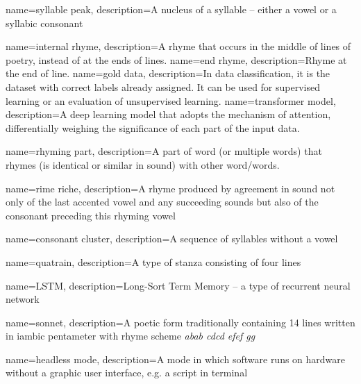 
{
	name=syllable peak,
	description={A nucleus of a syllable -- either a vowel or a syllabic consonant}
}

{
	name={internal rhyme},
	description={A rhyme that occurs in the middle of lines of poetry, instead of at the ends of lines.}
}
{
	name={end rhyme},
	description={Rhyme at the end of line.}
}
{
	name={gold data},
	description={In data classification, it is the dataset with correct labels already assigned. It can be used for supervised learning or an evaluation of unsupervised learning.}
}
{
	name=transformer model,
	description={A deep learning model that adopts the mechanism of attention, differentially weighing the significance of each part of the input data.}
}

{
	name=rhyming part,
	description={A part of word (or multiple words) that rhymes (is identical or similar in sound) with other word/words.}
}


{
	name=rime riche,
	description={A rhyme produced by agreement in sound not only of the last accented vowel and any succeeding sounds but also of the consonant preceding this rhyming vowel}
}


{
	name=consonant cluster,
	description={A sequence of syllables without a vowel}
}

{
	name=quatrain,
	description={A type of stanza consisting of four lines}
}

{
	name=LSTM,
	description={Long-Sort Term Memory -- a type of recurrent neural network}
}

{
	name=sonnet,
	description={A poetic form traditionally containing 14 lines written in iambic pentameter with rhyme scheme \textit{abab cdcd efef gg}}
}

{
	name=headless mode,
	description={A mode in which software runs on hardware without a graphic user interface, e.g. a script in terminal}
}